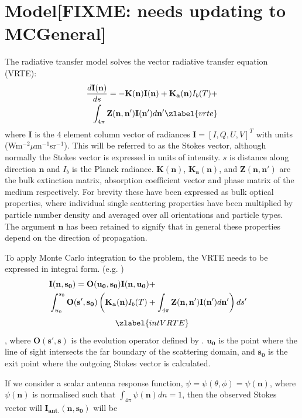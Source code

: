 \section{Model[FIXME: needs updating to MCGeneral]}
The radiative transfer model solves the vector
radiative transfer equation (VRTE):
\begin{eqnarray}
\frac{d\mathbf{I(n)}}{ds}=-\mathbf{K(n)I(n)} +
\mathbf{K_a(n)}I_b(T) +\nonumber\\
\int_{4\pi}\mathbf{Z(n,n')I(n')}d\mathbf{n'}
\zlabel{vrte}
\end{eqnarray}
where $\mathbf{I}$ is the 4 element column vector of radiances
$\mathbf{I}=\left[I,Q,U,V\right]^T$ with units
(Wm$^{-2}\mu$m$^{-1}$sr$^{-1}$). This will be referred to as the
Stokes vector, although normally the Stokes vector is expressed in
units of intensity.  $s$ is distance along direction $\mathbf{n}$ and
$I_b$ is the Planck radiance. $\mathbf{K(n)}$, $\mathbf{K_a(n)}$,
and $\mathbf{Z(n,n')}$ are the bulk extinction matrix, absorption
coefficient vector and phase matrix of the medium respectively.  For
 brevity these have been expressed as bulk optical
properties, where individual single scattering properties have been
multiplied by particle number density and averaged over all
orientations and particle types. The argument $\mathbf{n}$ has been
retained to signify that in general these properties depend on the
direction of propagation. 

To apply Monte Carlo integration to the problem, the VRTE needs to be expressed in integral form. (e.g. \cite{hochstadt:64})
\begin{eqnarray}
\lefteqn{\mathbf{I(n,s_0)}=\mathbf{O(u_0,s_0)I(n,u_0)}+}\nonumber\\
& \int_{u_0}^{s_0}\mathbf{O(s',s_0)}\left(\mathbf{K_a(n)}I_b(T) +\int_{4\pi}\mathbf{Z(n,n')}\mathbf{I(n')}d\mathbf{n'}\right)ds'\nonumber
\end{eqnarray}
\begin{equation}
\zlabel{intVRTE}
\end{equation}
, where $\mathbf{O(s',s)}$ is the evolution operator defined by
\cite{landi:85}. $\mathbf{u_0}$ is the point where the line of sight intersects
the far boundary of the scattering domain, and $\mathbf{s_0}$ is the
exit point where the outgoing Stokes vector is calculated.

If we consider a scalar antenna response function,
$\psi=\psi(\theta,\phi)=\psi(\mathbf{n})$, where $\psi(\mathbf{n})$ is
normalised such that $\int_{4\pi}\psi(\mathbf{n})dn=1$, then the
observed Stokes vector will $\mathbf{I_{ant.}(n,s_0)}$ will be

